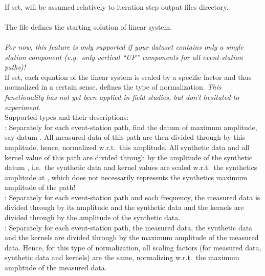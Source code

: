 \paragraph{}
If set,  will be assumed relatively to iteration step output files directory.
\paragraph{}
The  file  defines the starting solution of linear system.
\paragraph{}
\emph{For now, this feature is only supported if your dataset contains only a single station component 
(e.g.\ only vertical ``UP'' components for all event-station paths)!}\\
If set, each equation of the linear system is scaled by a specific factor and thus normalized in a certain sense.
 defines the type of normalization. \emph{This 
functionality has not yet been applied in field studies, but don't hesitated to experiment.}\\
Supported types and their descriptions:\\
\textbf{}: Separately for each event-station path, find the datum of maximum amplitude, say
datum . All 
measured data of this path are then divided through by this amplitude, hence, normalized w.r.t.\ this amplitude.
All synthetic data and all kernel value of this path are divided through by the amplitude of the synthetic datum
 , i.e.\ the synthetic data and kernel values are scaled w.r.t.\ the synthetics amplitude at 
, which does not necessarily represents the synthetics maximum amplitude of the path!\\
\textbf{}: Separately for each event-station path and each frequency,
the measured data is divided through by its amplitude and the synthetic data and the kernels are divided through
by the amplitude of the synthetic data.\\
\textbf{}: Separately for each event-station path, the measured data, the synthetic
data and the kernels are divided through by the maximum amplitude of the measured data. Hence, for this type of 
normalization, all scaling factors (for measured data, synthetic data and kernels) are the same, normalizing 
w.r.t.\ the maximum amplitude of the measured data.
